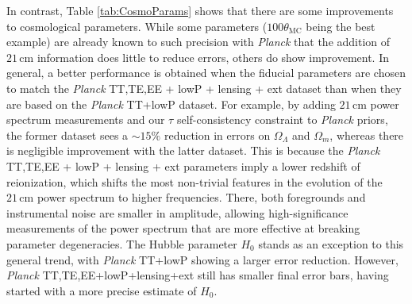 \documentclass[twocolumn,aps,prd,nofootinbib,showpacs,superscriptaddress]{revtex4-1}
\begin{document}
In contrast, Table \ref{tab:CosmoParams} shows that there are some improvements to cosmological parameters. While some parameters ($100 \theta_\textrm{MC}$ being the best example) are already known to such precision with \emph{Planck} that the addition of $21\,\textrm{cm}$ information does little to reduce errors, others do show improvement. In general, a better performance is obtained when the fiducial parameters are chosen to match the \emph{Planck} TT,TE,EE + lowP + lensing + ext dataset than when they are based on the \emph{Planck} TT+lowP dataset. For example, by adding $21\,\textrm{cm}$ power spectrum measurements and our $\tau$ self-consistency constraint to \emph{Planck} priors, the former dataset sees a $\sim 15\%$ reduction in errors on $\Omega_\Lambda$ and $\Omega_m$, whereas there is negligible improvement with the latter dataset. This is because the \emph{Planck} TT,TE,EE + lowP + lensing + ext parameters imply a lower redshift of reionization, which shifts the most non-trivial features in the evolution of the $21\,\textrm{cm}$ power spectrum to higher frequencies. There, both foregrounds and instrumental noise are smaller in amplitude, allowing high-significance measurements of the power spectrum that are more effective at breaking parameter degeneracies. The Hubble parameter $H_0$ stands as an exception to this general trend, with \emph{Planck} TT+lowP showing a larger error reduction. However, \emph{Planck} TT,TE,EE+lowP+lensing+ext still has smaller final error bars, having started with a more precise estimate of $H_0$.
\end{document}
